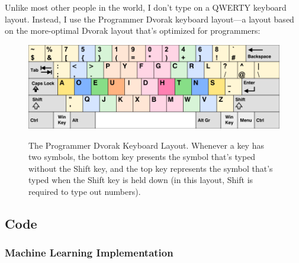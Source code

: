 \documentclass[12pt]{article}
\begin{document}
Unlike most other people in the world, I don't type on a QWERTY keyboard layout. Instead, I use the Programmer Dvorak keyboard layout—a layout based on the more-optimal Dvorak layout that's optimized for programmers:
\begin{figure}[H]
	\caption{The Programmer Dvorak Keyboard Layout. Whenever a key has two symbols, the bottom key presents the symbol that's typed without the Shift key, and the top key represents the symbol that's typed when the Shift key is held down (in this layout, Shift is required to type out numbers).}
	\includegraphics[width=\textwidth]{programmer-dvorak.png}
	\label{fig:programmer-dvorak}
\end{figure}

\subsection*{Code}

\subsubsection*{Machine Learning Implementation}
\end{document}
